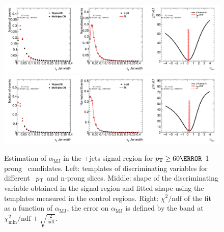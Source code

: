 		\begin{figure}
		\begin{center}
		\includegraphics[width=1\textwidth]{chapters/chapter6_HPlus/images/FFs/FFs_FIT_SR_TAUJET_1_60_80.png}
		\includegraphics[width=1\textwidth]{chapters/chapter6_HPlus/images/FFs/FFs_FIT_SR_TAUJET_1_80_3500.png}
		\end{center}
		\caption{
		Estimation of $\alpha_\mathrm{MJ}$ in the \tauhad+jets signal region for $\pt \geq 60 \GeV$
		1-prong \tauhad\ candidates. Left: templates of discriminating variables for different \tauhad\ $p_{\text{T}}$
		and n-prong slices. Middle: shape of the discriminating variable obtained in the signal region and fitted
		shape using the templates measured in the control regions. Right: $\chi^2/\mathrm{ndf}$ of the fit as a
		function of $\alpha_\mathrm{MJ}$, the error on $\alpha_\mathrm{MJ}$ is defined by the band at
		$\chi^2_\mathrm{min}/\mathrm{ndf}+\sqrt{\frac{2}{\mathrm{ndf}}}$.
		}
		\label{fig:mm:Fits:region3_2}
		\end{figure}

